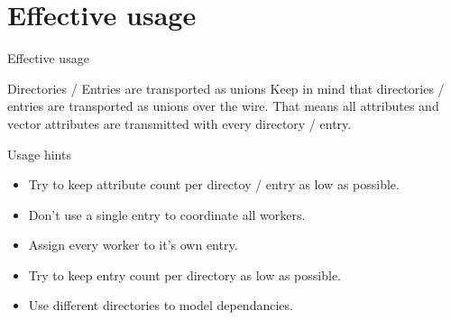 \documentclass{beamer}
\begin{document}
  \section{Effective usage}
    \begin{frame}{Effective usage}
      \begin{alertblock}{Directories / Entries are transported as unions}
        Keep in mind that directories / entries are transported as unions over the wire. That means 
        all attributes and vector attributes are transmitted with every directory / entry.
      \end{alertblock}
      
      \begin{block}{Usage hints}
        \begin{itemize}
          \item Try to keep attribute count per directoy / entry as low as possible.
          \item Don't use a single entry to coordinate all workers. 
          \item Assign every worker to it's own entry. 
          \item Try to keep entry count per directory as low as possible.
          \item Use different directories to model dependancies.
          \end{itemize}
       \end{block}
    \end{frame}
    
\end{document}
